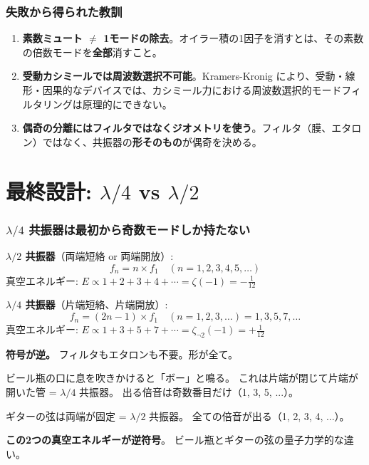\documentclass[12pt,a4paper]{article}
\begin{document}
\section{失敗から得られた教訓}

\begin{resultbox}[3つの教訓]
\begin{enumerate}
\item \textbf{素数ミュート $\neq$ 1モードの除去}。オイラー積の1因子を消すとは、その素数の倍数モードを\textbf{全部}消すこと。

\item \textbf{受動カシミールでは周波数選択不可能}。Kramers-Kronig により、受動・線形・因果的なデバイスでは、カシミール力における周波数選択的モードフィルタリングは原理的にできない。

\item \textbf{偶奇の分離にはフィルタではなくジオメトリを使う}。フィルタ（膜、エタロン）ではなく、共振器の\textbf{形そのもの}が偶奇を決める。
\end{enumerate}
\end{resultbox}

\part{最終設計: $\lambda/4$ vs $\lambda/2$}

\section{$\lambda/4$ 共振器は最初から奇数モードしか持たない}

\begin{mathbox}[2種類の共振器]
\textbf{$\lambda/2$ 共振器}（両端短絡 or 両端開放）:
$$f_n = n \times f_1 \quad (n = 1, 2, 3, 4, 5, \ldots)$$
真空エネルギー: $E \propto 1+2+3+4+\cdots = \zeta(-1) = -\frac{1}{12}$

\textbf{$\lambda/4$ 共振器}（片端短絡、片端開放）:
$$f_n = (2n-1) \times f_1 \quad (n = 1, 2, 3, \ldots) = 1, 3, 5, 7, \ldots$$
真空エネルギー: $E \propto 1+3+5+7+\cdots = \zeta_{\neg 2}(-1) = +\frac{1}{12}$

\textbf{符号が逆。} フィルタもエタロンも不要。形が全て。
\end{mathbox}

\begin{storybox}
ビール瓶の口に息を吹きかけると「ボー」と鳴る。
これは片端が閉じて片端が開いた管 = $\lambda/4$ 共振器。
出る倍音は奇数番目だけ（1, 3, 5, ...）。

ギターの弦は両端が固定 = $\lambda/2$ 共振器。
全ての倍音が出る（1, 2, 3, 4, ...）。

\textbf{この2つの真空エネルギーが逆符号}。
ビール瓶とギターの弦の量子力学的な違い。
\end{storybox}
\end{document}
